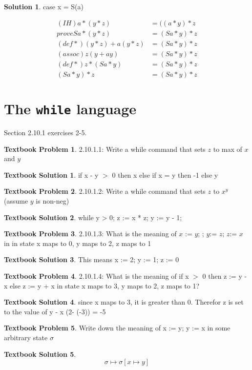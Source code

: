 \documentclass[10pt]{article}
\theoremstyle{definition}
\newtheorem{sol}{Solution}
\newtheorem{bp}{Textbook Problem}
\newtheorem{ts}{Textbook Solution}
\begin{document}
\begin{sol}

case x = S(a)

\begin{align*}
(IH) a * (y * z) &= ((a * y) * z \\
prove  Sa * (y * z) &= (Sa * y) * z \\
(def *) (y*z) + a (y*z) &= (Sa * y) * z \\
(assoc) z(y + ay) &= (Sa * y) * z\\
(def *)  z * (Sa * y) &= (Sa * y) * z \\
(Sa * y) * z &= (Sa * y) * z
\end{align*}

\end{sol}

\section*{The \texttt{while} language}

Section 2.10.1 exercises 2-5.
\setcounter{ts}{0}

\begin{bp}
2.10.1.1: Write a while command that sets $z$ to max of $x$ and $y$
\end{bp}


\begin{ts}
if x - y $>$ 0 then x else if x = y then -1 else y
\end{ts}


\begin{bp}
2.10.1.2: Write a while command that sets $z$ to $x^y$ (assume $y$ is non-neg)
\end{bp}


\begin{ts}
while y > 0;
	z := x * z;
	y := y - 1;
\end{ts}


\begin{bp}
2.10.1.3: What is the meaning of $x$ := $y$; ; $y$:= $z$; $z$:= $x$ in in state { x maps to 0, y maps to 2, z maps to 1}
\end{bp}


\begin{ts}
This means
x := 2;
y := 1;
z := 0
\end{ts}


\begin{bp}
2.10.1.4: What is the meaning of if x $>$ 0 then z := y - x else z := y + x in state {x maps to 3, y maps to 2, z maps to 1}?
\end{bp}


\begin{ts}
since x maps to 3, it is greater than 0. Therefor z is set to the value of y - x (2- (-3)) = -5
\end{ts}


\begin{bp}
Write down the meaning of x := y; y := x in some arbitrary state $ \sigma $
\end{bp}


\begin{ts}
\begin{equation}
\sigma \mapsto \sigma [ x \mapsto y]
\end{equation}
\end{ts}
\end{document}
